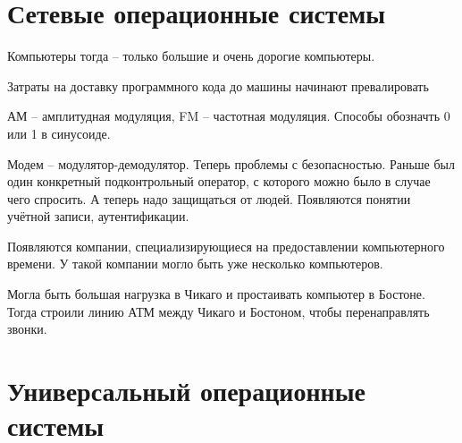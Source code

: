 \documentclass{book}
\theoremstyle{definition}
\begin{document}
    \section{Сетевые операционные системы}

    Компьютеры тогда -- только большие и очень дорогие компьютеры.

    Затраты на доставку программного кода до машины начинают превалировать

    АМ -- амплитудная модуляция, FM -- частотная модуляция. Способы обозначть 0 или 1 в синусоиде.

    Модем -- модулятор-демодулятор. Теперь проблемы с безопасностью. Раньше был один конкретный подконтрольный оператор, с которого можно было в случае чего спросить. А теперь надо защищаться от людей. Появляются понятии учётной записи, аутентификации.

    Появляются компании, специализирующиеся на предоставлении компьютерного времени. У такой компании могло быть уже несколько компьютеров.

    Могла быть большая нагрузка в Чикаго и простаивать компьютер в Бостоне. Тогда строили линию АТМ между Чикаго и Бостоном, чтобы перенаправлять звонки.
    
    \section{Универсальный операционные системы}
\end{document}
